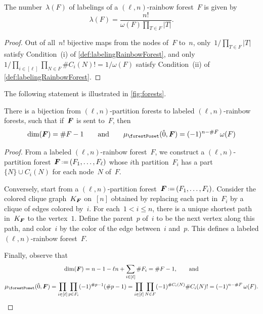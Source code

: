 \begin{lemma}
\label{lem:labelingRainbowForest}
The number~$\lambda(F)$ of labelings of a $(\ell,n)$-rainbow forest~$F$ is given by
\[
\lambda(F) = \frac{n!}{\omega(F) \prod\limits_{T \in F} |T|}.
\]
\end{lemma}

\begin{proof}
Out of all~$n!$ bijective maps from the nodes of~$F$ to~$n$, only~$1/\prod_{T \in F} |T|$ satisfy Condition~(i) of \cref{def:labelingRainbowForest}, and only $1/\prod_{i \in [\ell]} \prod_{N \in F} \#C_i(N)! = 1/\omega(F)$ satisfy Condition~(ii) of \cref{def:labelingRainbowForest}.
\end{proof}

The following statement is illustrated in \cref{fig:forests}.

\begin{proposition}
\label{prop:bijectionForests}
There is a bijection from $(\ell,n)$-partition forests to labeled $(\ell,n)$-rainbow forests, such that if~$\boldsymbol{F}$ is sent to~$F$, then
\[
\dim(\b{F}) = \#F-1
\qquad\text{and}\qquad
\mu_{\forestPoset}(\hat 0, \b{F}) = (-1)^{n-\#F} \, \omega(F)
\]
\end{proposition}

\begin{proof}
From a labeled $(\ell,n)$-rainbow forest~$F$, we construct a $(\ell,n)$-partition forest~$\b{F} \eqdef (F_1, \dots, F_\ell)$ whose $i$th partition~$F_i$ has a part~$\{N\} \cup C_i(N)$ for each node~$N$ of~$F$.

Conversely, start from a $(\ell,n)$-partition forest~$\b{F} \eqdef (F_1, \dots, F_i)$.
Consider the colored clique graph~$K_{\boldsymbol{F}}$ on~$[n]$ obtained by replacing each part in~$F_i$ by a clique of edges colored by~$i$.
For each~$1 < i \le n$, there is a unique shortest path in~$K_{\boldsymbol{F}}$ to the vertex~$1$.
Define the parent~$p$ of~$i$ to be the next vertex along this path, and color~$i$ by the color of the edge between~$i$ and~$p$.
This defines a labeled $(\ell,n)$-rainbow forest~$F$.

Finally, observe that
\begin{gather*}
\dim(\b{F}) = n - 1 - \ell n + \sum_{i \in [\ell]} \#F_i = \#F-1, \qquad\text{and} \\
\mu_{\forestPoset}(\hat 0, \b{F}) = \prod\limits_{i \in [\ell]} \prod\limits_{p \in F_i} (-1)^{\#p-1} (\#p-1) = \prod\limits_{i \in [\ell]} \prod\limits_{N \in F} (-1)^{\#C_i(N)} \#C_i(N)! = (-1)^{n-\#F} \, \omega(F).
\qedhere
\end{gather*}
\end{proof}

